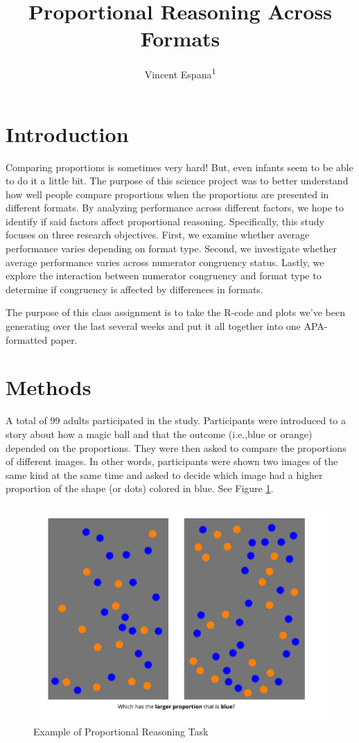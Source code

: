 \documentclass[
  man,floatsintext]{apa6}
\title{Proportional Reasoning Across Formats}
\author{Vincent Espana\textsuperscript{1}}
\date{}
\affiliation{\vspace{0.5cm}\textsuperscript{1} Rutgers University}
\begin{document}
\maketitle

\section{Introduction}\label{introduction}

Comparing proportions is sometimes very hard! But, even infants seem to be able to do it a little bit. The purpose of this science project was to better understand how well people compare proportions when the proportions are presented in different formats. By analyzing performance across different factors, we hope to identify if said factors affect proportional reasoning. Specifically, this study focuses on three research objectives. First, we examine whether average performance varies depending on format type. Second, we investigate whether average performance varies across numerator congruency status. Lastly, we explore the interaction between numerator congruency and format type to determine if congruency is affected by differences in formats.

The purpose of this class assignment is to take the R-code and plots we've been generating over the last several weeks and put it all together into one APA-formatted paper.

\section{Methods}\label{methods}

A total of 99 adults participated in the study. Participants were introduced to a story about how a magic ball and that the outcome (i.e.,blue or orange) depended on the proportions. They were then asked to compare the proportions of different images. In other words, participants were shown two images of the same kind at the same time and asked to decide which image had a higher proportion of the shape (or dots) colored in blue. See Figure \ref{fig:trial}.

\begin{figure}
\centering
\includegraphics{Probtask_Trial.png}
\caption{\label{fig:trial}Example of Proportional Reasoning Task}
\end{figure}
\end{document}
